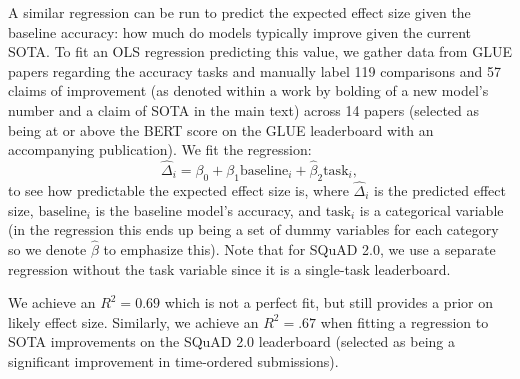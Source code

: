 \documentclass[11pt,a4paper]{article}
\begin{document}
A similar regression can be run to predict the expected effect size given the baseline accuracy: how much do models typically improve given the current SOTA. To fit an OLS regression predicting this value, we gather data from GLUE papers regarding the accuracy tasks and manually label 119 comparisons and 57 claims of improvement (as denoted within a work by bolding of a new model's number and a claim of SOTA in the main text) across 14 papers (selected as being at or above the BERT score on the GLUE leaderboard with an accompanying publication).  
We fit the regression:
\begin{equation}
    \widehat{\Delta}_i = \beta_0 + \beta_1 \text{baseline}_i + \hat{\beta}_2 \text{task}_i,
\end{equation}
\noindent to see how predictable the expected effect size is, where $\widehat{\Delta}_i$ is the predicted effect size, $\text{baseline}_i$ is the baseline model's accuracy, and $\text{task}_i$ is a categorical variable (in the regression this ends up being a set of dummy variables for each category so we denote $\hat{\beta}$ to emphasize this). Note that for SQuAD 2.0, we use a separate regression without the task variable since it is a single-task leaderboard.

We achieve an $R^2 = 0.69$ which is not a perfect fit, but still provides a prior on likely effect size. Similarly, we achieve an $R^2=.67$ when fitting a regression to SOTA improvements on the SQuAD 2.0 leaderboard (selected as being a significant improvement in time-ordered submissions). 
\end{document}
